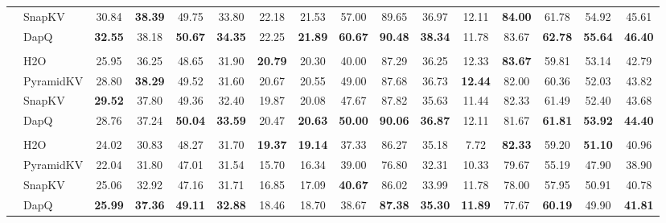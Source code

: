 \begin{table}[t]
{\begin{tabular}{>{\bfseries}c >{\raggedright}p{1.2cm} *{14}{c}}
& SnapKV & 30.84 & \textbf{38.39} & 49.75 & 33.80 & 22.18 & 21.53 & 57.00 & 89.65 & 36.97 & 12.11 & \textbf{84.00} & 61.78 & 54.92 & 45.61 \\
& DapQ & \textbf{32.55} & 38.18 & \textbf{50.67} & \textbf{34.35} & 22.25 & \textbf{21.89} & \textbf{60.67} & \textbf{90.48} & \textbf{38.34} & 11.78 & 83.67 & \textbf{62.78} & \textbf{55.64} & \textbf{46.40} \\
& \multicolumn{15}{c}{\cellcolor{gray!20}\textbf{KV Cache Size = 128}} \\
& H2O & 25.95 & 36.25 & 48.65 & 31.90 & \textbf{20.79} & 20.30 & 40.00 & 87.29 & 36.25 & 12.33 & \textbf{83.67} & 59.81 & 53.14 & 42.79 \\
& PyramidKV & 28.80 & \textbf{38.29} & 49.52 & 31.60 & 20.67 & 20.55 & 49.00 & 87.68 & 36.73 & \textbf{12.44} & 82.00 & 60.36 & 52.03 & 43.82 \\
& SnapKV & \textbf{29.52} & 37.80 & 49.36 & 32.40 & 19.87 & 20.08 & 47.67 & 87.82 & 35.63 & 11.44 & 82.33 & 61.49 & 52.40 & 43.68 \\
& DapQ & 28.76 & 37.24 & \textbf{50.04} & \textbf{33.59} & 20.47 & \textbf{20.63} & \textbf{50.00} & \textbf{90.06} & \textbf{36.87} & 12.11 & 81.67 & \textbf{61.81} & \textbf{53.92} & \textbf{44.40} \\
& \multicolumn{15}{c}{\cellcolor{gray!20}\textbf{KV Cache Size = 64}} \\
& H2O & 24.02 & 30.83 & 48.27 & 31.70 & \textbf{19.37} & \textbf{19.14} & 37.33 & 86.27 & 35.18 & 7.72 & \textbf{82.33} & 59.20 & \textbf{51.10} & 40.96 \\
& PyramidKV & 22.04 & 31.80 & 47.01 & 31.54 & 15.70 & 16.34 & 39.00 & 76.80 & 32.31 & 10.33 & 79.67 & 55.19 & 47.90 & 38.90 \\
& SnapKV & 25.06 & 32.92 & 47.16 & 31.71 & 16.85 & 17.09 & \textbf{40.67} & 86.02 & 33.99 & 11.78 & 78.00 & 57.95 & 50.91 & 40.78 \\
& DapQ & \textbf{25.99} & \textbf{37.36} & \textbf{49.11} & \textbf{32.88} & 18.46 & 18.70 & 38.67 & \textbf{87.38} & \textbf{35.30} & \textbf{11.89} & 77.67 & \textbf{60.19} & 49.90 & \textbf{41.81} \\
\midrule

\end{tabular}}
\end{table}
